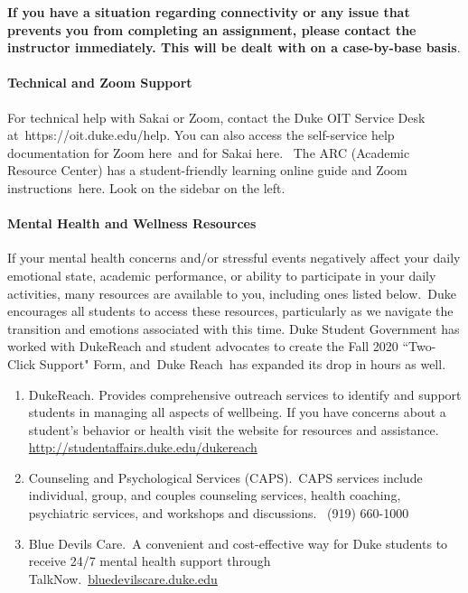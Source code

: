 \documentclass[11pt]{article}
\begin{document}
\textbf{If you have a situation regarding connectivity or any issue that prevents you from completing an assignment, please contact the instructor immediately. This will be dealt with on a case-by-base basis}. \\



\paragraph{Technical and Zoom Support}
For technical help with Sakai or Zoom, contact the Duke OIT Service Desk at https://oit.duke.edu/help. You can also access the self-service help documentation for Zoom here and for Sakai here.  The ARC (Academic Resource Center) has a student-friendly learning online guide and Zoom instructions here. Look on the sidebar on the left.\\

\paragraph{Mental Health and Wellness Resources}

If your mental health concerns and/or stressful events negatively affect your daily emotional state, academic performance, or ability to participate in your daily activities, many resources are available to you, including ones listed below. Duke encourages all students to access these resources, particularly as we navigate the transition and emotions associated with this time. Duke Student Government has worked with DukeReach and student advocates to create the Fall 2020 ``Two-Click Support" Form, and Duke Reach has expanded its drop in hours as well. 

\begin{enumerate}
\item DukeReach. Provides comprehensive outreach services to identify and support students in managing all aspects of wellbeing. If you have concerns about a student's behavior or health visit the website for resources and assistance. \url{http://studentaffairs.duke.edu/dukereach}
\item Counseling and Psychological Services (CAPS). CAPS services include individual, group, and couples counseling services, health coaching, psychiatric services, and workshops and discussions.  (919) 660-1000
\item Blue Devils Care. A convenient and cost-effective way for Duke students to receive 24/7 mental health support through TalkNow. \url{bluedevilscare.duke.edu}
\end{enumerate}
\end{document}
